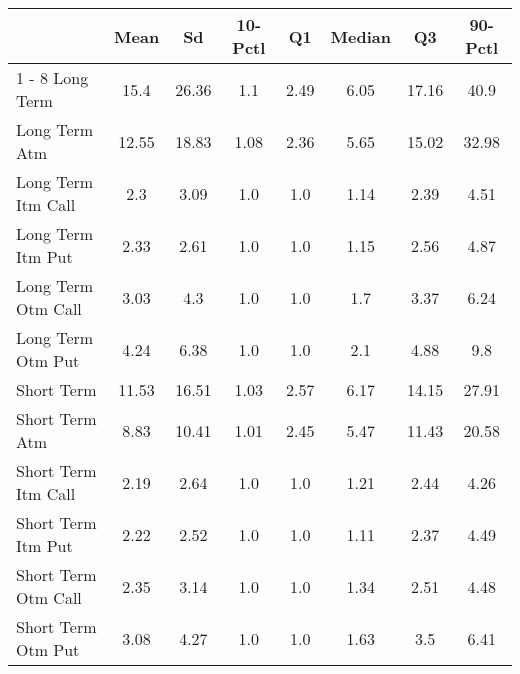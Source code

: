 \begin{tabular}{@{}lccccccc@{}}%
\toprule%
&Mean&Sd&10{-}Pctl&Q1&Median&Q3&90{-}Pctl\\%
\cmidrule{1%
-%
8}%
Long Term&15.4&26.36&1.1&2.49&6.05&17.16&40.9\\%
Long Term Atm&12.55&18.83&1.08&2.36&5.65&15.02&32.98\\%
Long Term Itm Call&2.3&3.09&1.0&1.0&1.14&2.39&4.51\\%
Long Term Itm Put&2.33&2.61&1.0&1.0&1.15&2.56&4.87\\%
Long Term Otm Call&3.03&4.3&1.0&1.0&1.7&3.37&6.24\\%
Long Term Otm Put&4.24&6.38&1.0&1.0&2.1&4.88&9.8\\%
Short Term&11.53&16.51&1.03&2.57&6.17&14.15&27.91\\%
Short Term Atm&8.83&10.41&1.01&2.45&5.47&11.43&20.58\\%
Short Term Itm Call&2.19&2.64&1.0&1.0&1.21&2.44&4.26\\%
Short Term Itm Put&2.22&2.52&1.0&1.0&1.11&2.37&4.49\\%
Short Term Otm Call&2.35&3.14&1.0&1.0&1.34&2.51&4.48\\%
Short Term Otm Put&3.08&4.27&1.0&1.0&1.63&3.5&6.41\\\bottomrule%
%
\end{tabular}